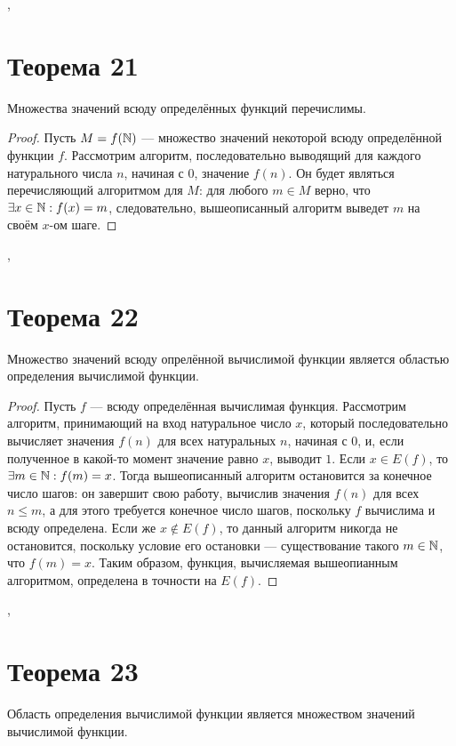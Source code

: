 \documentclass[a4paper,12pt]{article}
\begin{document}
    \sep
    
    \section {Теорема 21}
    \begin{theorem}
    Множества значений всюду определённых функций перечислимы.
    \end{theorem}
    \begin{proof} 
    Пусть $M=f(\mathbb{N})$ --- множество значений некоторой всюду определённой функции $f$. Рассмотрим алгоритм, последовательно выводящий для каждого натурального числа $n$, начиная с $0$, значение $f(n)$. Он будет являться перечисляющий алгоритмом для $M$: для любого $m\in M$ верно, что $\exists x \in \mathbb{N} : f(x) = m$, следовательно, вышеописанный алгоритм выведет $m$ на своём $x$-ом шаге.
    \end{proof}
	
	\sep
    
    \section {Теорема 22}
    \begin{theorem}
    Множество значений всюду опрелённой вычислимой функции является областью определения вычислимой функции.
    \end{theorem} 
    \begin{proof} Пусть $f$ --- всюду определённая вычислимая функция. Рассмотрим алгоритм, принимающий на вход натуральное число $x$, который последовательно вычисляет значения $f(n)$ для всех натуральных $n$, начиная с $0$, и, если полученное в какой-то момент значение равно $x$, выводит $1$. Если $x\in E(f)$, то $\exists m \in \mathbb{N} : f(m) = x$. Тогда вышеописанный алгоритм остановится за конечное число шагов: он завершит свою работу, вычислив значения $f(n)$ для всех $n\leqslant m$, а для этого требуется конечное число шагов, поскольку $f$ вычислима и всюду определена. Если же $x\not\in E(f)$, то данный алгоритм никогда не остановится, поскольку условие его остановки --- существование такого $m\in\mathbb{N}$, что $f(m)=x$. Таким образом, функция, вычисляемая вышеопианным алгоритмом, определена в точности на $E(f)$.
    \end{proof}
	
	\sep
	

    \section {Теорема 23}
    \begin{theorem}
        Область определения вычислимой функции является множеством значений вычислимой функции.
    \end{theorem}
\end{document}
